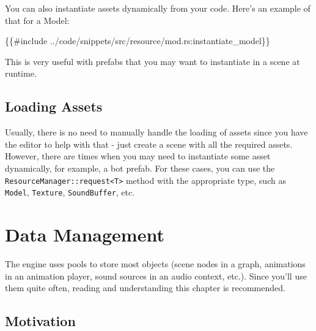 \documentclass[
]{book}
\newenvironment{Shaded}{\begin{snugshade}}{\end{snugshade}}
\newcommand{\NormalTok}[1]{#1}
\theoremstyle{definition}
\theoremstyle{definition}
\theoremstyle{definition}
\theoremstyle{definition}
\theoremstyle{remark}
\begin{document}
You can also instantiate assets dynamically from your code. Here's an example of that for a Model:

\begin{Shaded}
\begin{Highlighting}[]
\NormalTok{\{\{\#include ../code/snippets/src/resource/mod.rs:instantiate\_model\}\}}
\end{Highlighting}
\end{Shaded}

This is very useful with prefabs that you may want to instantiate in a scene at runtime.

\subsection{Loading Assets}\label{loading-assets}

Usually, there is no need to manually handle the loading of assets since you have the editor to help with that - just create a scene with all the required assets. However, there are times when you may need to instantiate some asset dynamically, for example, a bot prefab. For these cases, you can use the \texttt{ResourceManager::request\textless{}T\textgreater{}} method with the appropriate type, such as \texttt{Model}, \texttt{Texture}, \texttt{SoundBuffer}, etc.

\section{Data Management}\label{data-management}

The engine uses pools to store most objects (scene nodes in a graph, animations in an animation player, sound sources in an audio context, etc.). Since you'll use them quite often, reading and understanding this chapter is recommended.

\subsection{Motivation}\label{motivation}
\end{document}
